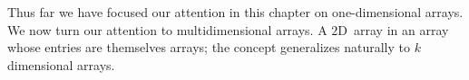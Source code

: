 \documentclass[10pt,openany,twoside,letterpaper,extrafontsizes]{memoir}
\newcommand{\myindex}[1]{%
\index[terms]{#1}%
}
\newcommand{\mycaption}[1]{%
  \textsf{\textbf{\caption{\textnormal{\textsf{#1}}}} \stepcounter{figure_num}}%
}
\begin{document}
\begin{Spacing}{\arraysSpacing}
%
%
%
%
%
%
% 
%
%


Thus far we have focused our attention in this chapter on one-dimensional arrays.  We now
turn our attention to multidimensional arrays.
A $2$D~array in an array whose
entries are themselves arrays; the concept generalizes naturally to $k$ dimensional arrays.


\end{Spacing}
\end{document}
